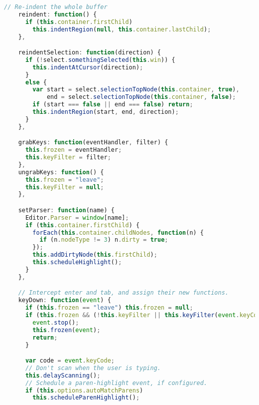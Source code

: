 \begin{lstlisting}[language=Javascript]
    // Re-indent the whole buffer
    reindent: function() {
      if (this.container.firstChild)
        this.indentRegion(null, this.container.lastChild);
    },

    reindentSelection: function(direction) {
      if (!select.somethingSelected(this.win)) {
        this.indentAtCursor(direction);
      }
      else {
        var start = select.selectionTopNode(this.container, true),
            end = select.selectionTopNode(this.container, false);
        if (start === false || end === false) return;
        this.indentRegion(start, end, direction);
      }
    },

    grabKeys: function(eventHandler, filter) {
      this.frozen = eventHandler;
      this.keyFilter = filter;
    },
    ungrabKeys: function() {
      this.frozen = "leave";
      this.keyFilter = null;
    },

    setParser: function(name) {
      Editor.Parser = window[name];
      if (this.container.firstChild) {
        forEach(this.container.childNodes, function(n) {
          if (n.nodeType != 3) n.dirty = true;
        });
        this.addDirtyNode(this.firstChild);
        this.scheduleHighlight();
      }
    },

    // Intercept enter and tab, and assign their new functions.
    keyDown: function(event) {
      if (this.frozen == "leave") this.frozen = null;
      if (this.frozen && (!this.keyFilter || this.keyFilter(event.keyCode, event))) {
        event.stop();
        this.frozen(event);
        return;
      }

      var code = event.keyCode;
      // Don't scan when the user is typing.
      this.delayScanning();
      // Schedule a paren-highlight event, if configured.
      if (this.options.autoMatchParens)
        this.scheduleParenHighlight();


\end{lstlisting}
